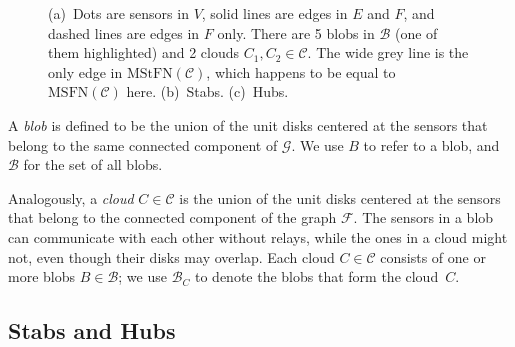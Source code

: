 \documentclass[11pt,a4paper]{article}
\newcommand{\myB}{\mathcal{B}} \newcommand{\myC}{\mathcal{C}} \newcommand{\myD}{\mathcal{D}} \newcommand{\myP}{\mathcal{P}} \newcommand{\myS}{\mathcal{S}}
\newcommand{\myF}{\mathcal{F}}
\newcommand{\myG}{\mathcal{G}}
\newcommand{\MSTN}{\mathrm{MSFN}}
\newcommand{\MStTN}{\mathrm{MStFN}}
\theoremstyle{definition}
\theoremstyle{remark}
\begin{document}
\begin{figure}[t]
    \centering
    \caption{(a)~Dots are sensors in $V$, solid lines are edges in $E$ and $F$, and dashed lines are edges in $F$ only. There are 5 blobs in $\myB$ (one of them highlighted) and 2 clouds $C_1, C_2 \in \myC$. The wide grey line is the only edge in $\MStTN(\myC)$, which happens to be equal to $\MSTN(\myC)$ here. (b)~Stabs. (c)~Hubs.}\label{fig:clouds}
\end{figure}

A \emph{blob} is defined to be the union of the unit disks centered at the sensors that belong to the same connected component of $\myG$. We use $B$ to refer to a blob, and $\myB$ for the set of all blobs.

Analogously, a \emph{cloud} $C \in \myC$ is the union of the unit disks centered at the sensors that belong to the connected component of the graph $\myF$. The sensors in a blob can communicate with each other without relays, while the ones in a cloud might not, even though their disks may overlap. Each cloud $C \in \myC$ consists of one or more blobs $B \in \myB$; we use $\myB_C$ to denote the blobs that form the cloud~$C$.

\subsection{Stabs and Hubs}
\end{document}

